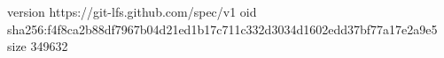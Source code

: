 version https://git-lfs.github.com/spec/v1
oid sha256:f4f8ca2b88df7967b04d21ed1b17c711c332d3034d1602edd37bf77a17e2a9e5
size 349632
